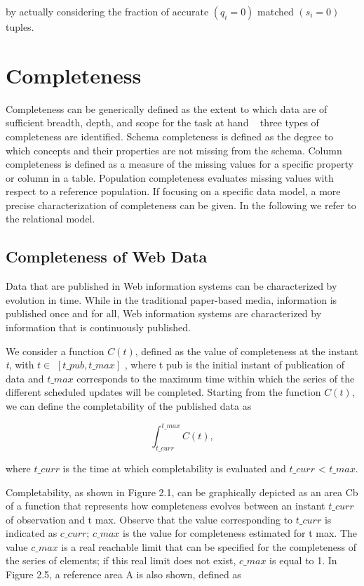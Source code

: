 by actually considering the fraction of accurate $(q_i = 0)$ matched $(s_i =0)$ tuples.

\section{Completeness}
Completeness can be generically defined as the extent to which data are
of sufficient breadth, depth, and scope for the task at hand ~\cite{Wang}
three types of completeness are identified. Schema completeness is defined as
the degree to which concepts and their properties are not missing from the
schema. Column completeness is defined as a measure of the missing values for
a specific property or column in a table. Population completeness evaluates
missing values with respect to a reference population.
If focusing on a specific data model, a more precise characterization of
completeness can be given. In the following we refer to the relational model.

\subsection{Completeness of Web Data}

Data that are published in Web information systems can be characterized by
evolution in time. While in the traditional paper-based media, information
is published once and for all, Web information systems are characterized by
information that is continuously published.

We consider a function $C(t)$, defined as the value of completeness at the
instant \textit{t}, with $t\in$ $[t\_pub, t\_max]$ , where t pub is the initial 
instant of publication of data and ${t\_max}$ corresponds to the maximum time within which the
series of the different scheduled updates will be completed. Starting from the
function $C(t)$, we can define the completability of the published data as

\begin{equation*}
    \int\nolimits_{t\_curr}^{t\_max} C(t),
\end{equation*}

where ${t\_curr}$ is the time at which completability is evaluated and ${t\_curr}$ <
${t\_max}$.

Completability, as shown in Figure 2.1, can be graphically depicted as an
area Cb of a function that represents how completeness evolves between an
instant ${t\_curr}$ of observation and t max. Observe that the value corresponding
to ${t\_curr}$ is indicated as ${c\_curr}$; ${c\_max}$ is the value for completeness estimated
for t max. The value ${c\_max}$ is a real reachable limit that can be specified for
the completeness of the series of elements; if this real limit does not exist,
${c\_max}$ is equal to 1. In Figure 2.5, a reference area A is also shown, defined as

